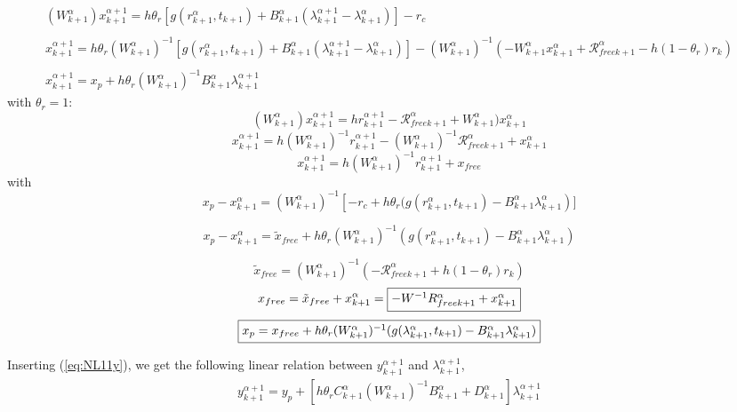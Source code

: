 \begin{equation}
   \begin{array}{l}
    (W^{\alpha}_{k+1})x^{\alpha+1}_{k+1} = h \theta _r \left[ g(r^{\alpha}_{k+1},t_{k+1}) +
    B^{\alpha}_{k+1} (\lambda^{\alpha+1}_{k+1} - \lambda^{\alpha}_{k+1}) \right] -r_c \\ \\
    x^{\alpha+1}_{k+1} = h \theta _r (W^{\alpha}_{k+1})^{-1}\left[ g(r^{\alpha}_{k+1},t_{k+1}) + B^{\alpha}_{k+1} (\lambda^{\alpha+1}_{k+1} - \lambda^{\alpha}_{k+1}) \right] -(W^{\alpha}_{k+1})^{-1}(- W^{\alpha}_{k+1} x^{\alpha}_{k+1} + \mathcal R_{free k+1} ^{\alpha} - h(1-\theta_r)r_k) \\ \\
    x^{\alpha+1}_{k+1} =  x_p + h \theta _r (W^{\alpha}_{k+1})^{-1}  B^{\alpha}_{k+1}
    \lambda^{\alpha+1}_{k+1} 

   \end{array}
\end{equation}
with $\theta _r =1$:
\[(W^{\alpha}_{k+1})x^{\alpha+1}_{k+1}= hr^{\alpha+1}_{k+1}- \mathcal R_{free k+1} ^{\alpha}+W^{\alpha}_{k+1})x^{\alpha}_{k+1}\]
\[x^{\alpha+1}_{k+1}= h(W^{\alpha}_{k+1})^{-1}r^{\alpha+1}_{k+1}- (W^{\alpha}_{k+1})^{-1} \mathcal R_{free k+1} ^{\alpha}+x^{\alpha}_{k+1}\]
\[x^{\alpha+1}_{k+1}= h(W^{\alpha}_{k+1})^{-1}r^{\alpha+1}_{k+1}+x_{free}\]
with
\begin{equation}
x_p - x^{\alpha}_{k+1} =  (W^{\alpha}_{k+1})^{-1}  \left[ -r_c + h \theta _r( g(r^{\alpha}_{k+1},t_{k+1}) -
      B^{\alpha}_{k+1} \lambda^{\alpha}_{k+1} \right)]
  \end{equation}

\[ x_p - x^{\alpha}_{k+1} = \tilde x_{free} + h \theta _r(W^{\alpha}_{k+1})^{-1}( g(r^{\alpha}_{k+1},t_{k+1}) -
      B^{\alpha}_{k+1} \lambda^{\alpha}_{k+1} ) \]
      
\[    \tilde x_{free}= (W^{\alpha}_{k+1})^{-1}(-
      \mathcal R _{free k+1} ^{\alpha} +h(1-\theta _r)r_k)\]
      \[x_{free} = \tilde x_{free} + x^{\alpha}_{k+1}=\fbox{$-W^{-1}R_{free k+1} ^{\alpha} + x^{\alpha}_{k+1}$}\]
\[ \fbox{$x_p  = x_{free} + h \theta _r(W^{\alpha}_{k+1})^{-1}( g(\lambda ^{\alpha}_{k+1},t_{k+1}) -
      B^{\alpha}_{k+1} \lambda^{\alpha}_{k+1} )$} \]

    
Inserting (\ref{eq:NL11y}), we get the following linear relation between $y^{\alpha+1}_{k+1}$ and $\lambda^{\alpha+1}_{k+1}$, 
\begin{equation}
   \begin{array}{l}
 y^{\alpha+1}_{k+1} = y_p + \left[ h \theta _r C^{\alpha}_{k+1} (W^{\alpha}_{k+1})^{-1}  B^{\alpha}_{k+1} + D^{\alpha}_{k+1} \right]\lambda^{\alpha+1}_{k+1}
   \end{array}
\end{equation}

